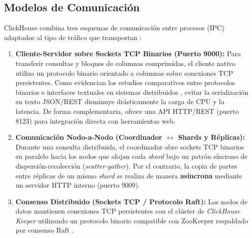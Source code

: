 \documentclass[12pt,a4paper]{article}
\begin{document}
\subsection{Modelos de Comunicación}
ClickHouse combina tres esquemas de comunicación entre procesos (IPC) adaptados al tipo de tráfico que transportan \cite{vansteen2023distributed, buzhin2023comparative, blinowski2022monolithic}:
\begin{enumerate}[leftmargin=1.2cm]
    \item \textbf{Cliente-Servidor sobre Sockets TCP Binarios (Puerto 9000):} Para transferir consultas y bloques de columnas comprimidas, el cliente nativo utiliza un protocolo binario orientado a columnas sobre conexiones TCP persistentes. Como evidencian los estudios comparativos entre protocolos binarios e interfaces textuales en sistemas distribuidos \cite{buzhin2023comparative, blinowski2022monolithic}, evitar la serialización en texto JSON/REST disminuye drásticamente la carga de CPU y la latencia. De forma complementaria, ofrece una API HTTP/REST (puerto 8123) para integración directa con herramientas web.
    \item \textbf{Comunicación Nodo-a-Nodo (Coordinador $\leftrightarrow$ Shards y Réplicas):} Durante una consulta distribuida, el coordinador abre sockets TCP binarios en paralelo hacia los nodos que alojan cada \textit{shard} bajo un patrón síncrono de dispersión-recolección (\textit{scatter-gather}). Por el contrario, la copia de partes entre réplicas de un mismo \textit{shard} se realiza de manera \textbf{asíncrona} mediante un servidor HTTP interno (puerto 9009).
    \item \textbf{Consenso Distribuido (Sockets TCP / Protocolo Raft):} Los nodos de datos mantienen conexiones TCP persistentes con el clúster de \textit{ClickHouse Keeper} utilizando un protocolo binario compatible con ZooKeeper respaldado por consenso Raft \cite{han2024palf}.
\end{enumerate}
\end{document}
